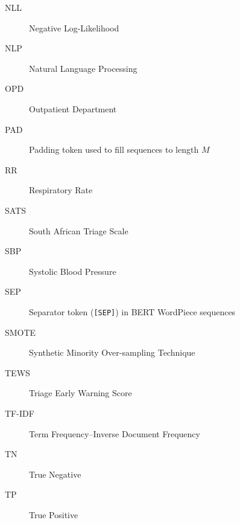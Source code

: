 \begin{description}
\item[NLL] Negative Log-Likelihood
\item[NLP] Natural Language Processing
\item[OPD] Outpatient Department
\item[PAD] Padding token used to fill sequences to length \(M\)
\item[RR] Respiratory Rate
\item[SATS] South African Triage Scale
\item[SBP] Systolic Blood Pressure
\item[SEP] Separator token (\texttt{[SEP]}) in BERT WordPiece sequences
\item[SMOTE] Synthetic Minority Over-sampling Technique
\item[TEWS] Triage Early Warning Score
\item[TF-IDF] Term Frequency--Inverse Document Frequency
\item[TN] True Negative
\item[TP] True Positive
\end{description}
